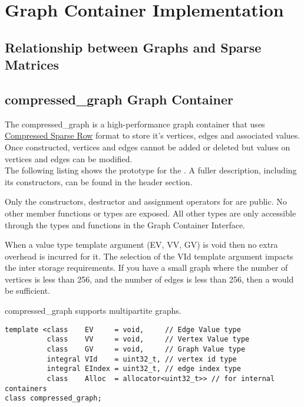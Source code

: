 
\chapter{Graph Container Implementation}

\section{Relationship between Graphs and Sparse Matrices}


\section{compressed\_graph Graph Container}
The compressed\_graph is a high-performance graph container that uses \href{https://en.wikipedia.org/wiki/Sparse_matrix#Compressed_sparse_row_\%28CSR\%2C_CRS_or_Yale_format\%29}{Compressed Sparse Row} format to store it's vertices, edges and associated values. Once constructed, vertices and edges cannot be added or deleted but values on vertices and edges can be modified.
\\

The following listing shows the prototype for the . A fuller description, including its constructors, can be found in the  header section.

Only the constructors, destructor and assignment operators for  are public. No other member functions or types are exposed. All other types are only accessible through the types and functions in the Graph Container Interface.

When a value type template argument (EV, VV, GV) is void then no extra overhead is incurred for it. The selection of the VId template argument impacts the inter storage requirements. If you have a small graph where the number of vertices is less than 256, and the number of edges is less than 256, then a  would be sufficient.

compressed\_graph supports multipartite graphs.

\begin{lstlisting}
template <class    EV     = void,     // Edge Value type
          class    VV     = void,     // Vertex Value type
          class    GV     = void,     // Graph Value type
          integral VId    = uint32_t, // vertex id type
          integral EIndex = uint32_t, // edge index type
          class    Alloc  = allocator<uint32_t>> // for internal containers
class compressed_graph;
\end{lstlisting}

